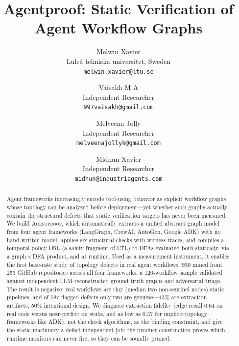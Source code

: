 \documentclass[11pt]{article}
\title{Agentproof: Static Verification of Agent Workflow Graphs}
\author{
  Melwin Xavier \\
  Lule\aa{} tekniska universitet, Sweden \\
  \texttt{melwin.xavier@ltu.se}
  \and
  Vaisakh M A \\
  Independent Researcher \\
  \texttt{997vaisakh@gmail.com}
  \and
  Melveena Jolly \\
  Independent Researcher \\
  \texttt{melveenajollyk@gmail.com}
  \and
  Midhun Xavier \\
  Independent Researcher \\
  \texttt{midhun@industriagents.com}
}
\date{}
\begin{document}
\maketitle

\begin{abstract}
Agent frameworks increasingly encode tool-using behavior as explicit
workflow graphs whose topology can be analyzed before deployment---yet
whether such graphs actually contain the structural defects that static
verification targets has never been measured. We build
\textsc{Agentproof}, which automatically extracts a unified abstract
graph model from four agent frameworks (LangGraph, CrewAI, AutoGen,
Google ADK) with no hand-written model, applies six structural checks
with witness traces, and compiles a temporal policy DSL (a safety
fragment of LTL) to DFAs evaluated both statically, via a
graph\,$\times$\,DFA product, and at runtime. Used as a measurement
instrument, it enables the first base-rate study of topology defects in
real agent workflows: 930 mined from 253 GitHub repositories across all
four frameworks, a 120-workflow sample validated against independent
LLM-reconstructed ground-truth graphs and adversarial triage. The result
is negative: real workflows are tiny (median two non-sentinel nodes)
static pipelines, and of 187 flagged defects only two are genuine---43\%
are extraction artifacts, 50\% intentional design. We diagnose extraction
fidelity (edge recall 0.64 on real code versus near-perfect on stubs, and
as low as 0.37 for implicit-topology frameworks like ADK), not the check
algorithms, as the binding constraint, and give the static machinery a
defect-independent job: the product construction proves which runtime
monitors can never fire, so they can be soundly pruned.
\end{abstract}
















\appendix


\end{document}
